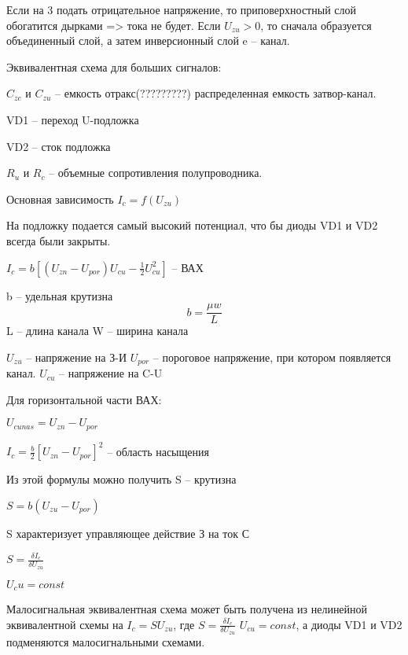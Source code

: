Если на 3 подать отрицательное напряжение, то приповерхностный слой обогатится дырками => тока не будет.
Если $U_{zu}>0$, то сначала образуется объединенный слой, а затем инверсионный слой e – канал.

Эквивалентная схема для больших сигналов:
\begin{center}
\begin{figure}[h!]
		\label{}
	\end{figure}
\end{center}
$C_{zc}$ и $C_{zu}$ – емкость отракс(?????????) распределенная емкость затвор-канал.

VD1 – переход U-подложка

VD2 – сток подложка

$R_u$ и $R_c$ – объемные сопротивления полупроводника.

Основная зависимость $I_c=f(U_{zu})$
\begin{center}
\begin{figure}[h!]
		\label{}
	\end{figure}
\end{center}

На подложку подается самый высокий потенциал, что бы диоды VD1 и VD2 всегда были закрыты.

$I_c=b[(U_{zn} - U_{por})U_{cu}-\frac12 U_{cu}^2]$ – ВАХ


b – удельная крутизна
$$
b = \frac{\mu w}{L}
$$
L – длина канала
W – ширина канала

$U_{zu}$ – напряжение на З-И
$U_{por}$ – пороговое напряжение, при котором появляется канал.
$U_{cu}$ – напряжение на C-U

Для горизонтальной части ВАХ:

$U_{cunas}=U_{zn} - U_{por}$

$I_c=\frac{b}{2}[U_{zn} - U_{por}]^{2}$ – область насыщения

Из этой формулы можно получить S – крутизна

$S = b(U_{zu} - U_{por})$

S характеризует управляющее действие З на ток С

$S= \frac{\delta I_c}{\delta U_{zu}}$

$U_cu=const$

Малосигнальная эквивалентная схема может быть получена из нелинейной эквивалентной схемы на $I_c=SU_{zu}$, где $S= \frac{\delta I_c}{\delta U_{zu}}$   $U_{cu}=const$, а диоды VD1 и VD2 подменяются малосигнальными схемами.

